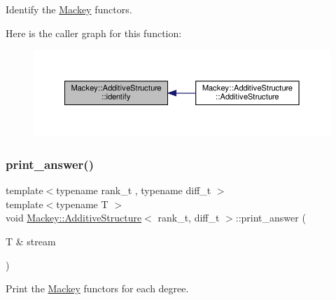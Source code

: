 Identify the \hyperlink{namespaceMackey}{Mackey} functors. 

Here is the caller graph for this function\+:\nopagebreak
\begin{figure}[H]
\begin{center}
\leavevmode
\includegraphics[width=350pt]{classMackey_1_1AdditiveStructure_a07887e78e182c1215fc7c8af3f385529_icgraph}
\end{center}
\end{figure}
\mbox{\label{classMackey_1_1AdditiveStructure_a2ab350a9e5187964b9cf42c3f36805fa}} 
\subsubsection{\texorpdfstring{print\+\_\+answer()}{print\_answer()}}
{\footnotesize\ttfamily template$<$typename rank\+\_\+t , typename diff\+\_\+t $>$ \\
template$<$typename T $>$ \\
void \hyperlink{classMackey_1_1AdditiveStructure}{Mackey\+::\+Additive\+Structure}$<$ rank\+\_\+t, diff\+\_\+t $>$\+::print\+\_\+answer (\begin{DoxyParamCaption}\item[{T \&}]{stream }\end{DoxyParamCaption})}



Print the \hyperlink{namespaceMackey}{Mackey} functors for each degree. 

